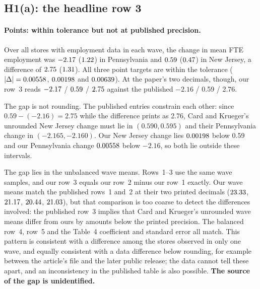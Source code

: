 \documentclass[11pt]{article}
\begin{document}
\subsection{H1(a): the headline row 3}
\label{sec:h1a}

\paragraph{Points: within tolerance but not at published precision.} Over all stores with
employment data in each wave, the change in mean FTE employment was $-2.17$
($1.22$) in Pennsylvania and $0.59$ ($0.47$) in New Jersey, a difference
of $2.75$ ($1.31$). All three point targets are within the tolerance
($|\Delta| = 0.00558$, $0.00198$ and $0.00639$). At the paper's two
decimals, though, our row~3 reads $-2.17$ / $0.59$ / $2.75$ against the
published $-2.16$ / 0.59 / 2.76.

The gap is not rounding. The published entries constrain each other: since
$0.59 - (-2.16) = 2.75$ while the difference prints as 2.76, Card and Krueger's unrounded New
Jersey change must lie in $(0.590, 0.595)$ and their Pennsylvania change in
$(-2.165, -2.160)$. Our New Jersey change lies $0.00198$ below 0.59 and our
Pennsylvania change $0.00558$ below $-2.16$, so both lie outside these intervals.

The gap lies in the unbalanced wave means. Rows~1--3 use the same wave samples, and our
row~3 equals our row~2 minus our row~1 exactly. Our wave means match the published rows~1
and~2 at their two printed decimals ($23.33$, $21.17$, $20.44$,
$21.03$), but that comparison is too coarse to detect the differences involved: the
published row~3 implies that Card and Krueger's unrounded wave means differ from ours by
amounts below the printed precision. The balanced row~4, row~5 and the Table~4 coefficient
and standard error all match. This pattern is consistent with a difference among the stores
observed in only one wave, and equally consistent with a data difference below rounding,
for example between the article's file and the later public release; the data cannot tell
these apart, and an inconsistency in the published table is also possible. \textbf{The
source of the gap is unidentified.}
\end{document}
